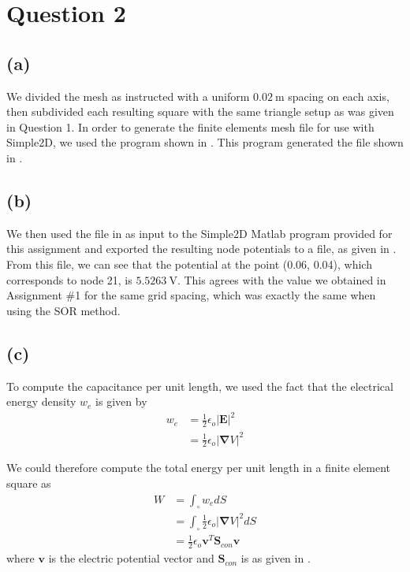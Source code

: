 \documentclass[journal,hidelinks]{IEEEtran}
\begin{document}
\section*{Question 2}

\subsection*{(a)}

We divided the mesh as instructed with a uniform $\SI{0.02}{\meter}$ spacing on each axis, then subdivided each resulting square with the same triangle setup as was given in Question 1.
In order to generate the finite elements mesh file for use with Simple2D, we used the program shown in . This program generated the file shown in .

\subsection*{(b)}

We then used the file in  as input to the Simple2D Matlab program provided for this assignment and exported the resulting node potentials to a file, as given in . From this file, we can see that the potential at the point (0.06, 0.04), which corresponds to node 21, is $\SI{5.5263}{\volt}$. This agrees with the value we obtained in Assignment \#1 for the same grid spacing, which was exactly the same when using the SOR method.

\subsection*{(c)}
\label{sec:q2c}

To compute the capacitance per unit length, we used the fact that the electrical energy density $w_e$ is given by
\begin{align}
w_e &= \frac{1}{2} \epsilon_o |\boldsymbol{E}|^2 \\
    &= \frac{1}{2} \epsilon_o |\boldsymbol{\nabla} V|^2
\end{align}

We could therefore compute the total energy per unit length in a finite element square as
\begin{align}
W &= \int_{\square} w_e dS \\
  &= \int_{\square} \frac{1}{2} \epsilon_o |\boldsymbol{\nabla} V|^2 dS \\
\label{eq:capacitance}
  &= \frac{1}{2} \epsilon_o \boldsymbol{v}^T \boldsymbol{S}_{con} \boldsymbol{v}
\end{align}
where $\boldsymbol{v}$ is the electric potential vector and $\boldsymbol{S}_{con}$ is as given in .
\end{document}
